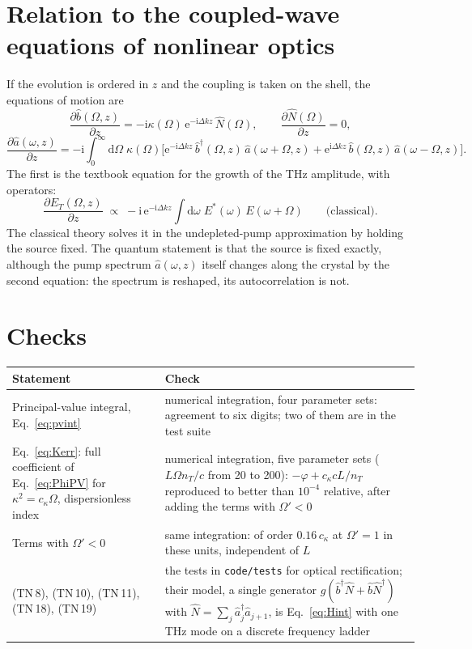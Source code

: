 \documentclass[aps,pra,onecolumn,notitlepage,11pt,amsmath,amssymb,nofootinbib]{revtex4-2}
\newcommand{\Nop}{\hat N}
\newcommand{\dd}{\mathrm{d}}
\newcommand{\ee}{\mathrm{e}}
\newcommand{\ii}{\mathrm{i}}
\begin{document}
\section{Relation to the coupled-wave equations of nonlinear optics}

If the evolution is ordered in $z$ and the coupling is taken on the shell,
the equations of motion are
\begin{equation}
\frac{\partial\hat b(\Omega,z)}{\partial z}=-\ii\kappa(\Omega)\,\ee^{-\ii\Delta kz}\,\Nop(\Omega),\qquad
\frac{\partial\Nop(\Omega)}{\partial z}=0,
\end{equation}
\begin{equation}
\frac{\partial\hat a(\omega,z)}{\partial z}=-\ii\int_0^\infty\!\!\dd\Omega\;\kappa(\Omega)
\Big[\ee^{-\ii\Delta kz}\,\hat b^\dagger(\Omega,z)\,\hat a(\omega+\Omega,z)
+\ee^{\ii\Delta kz}\,\hat b(\Omega,z)\,\hat a(\omega-\Omega,z)\Big].
\end{equation}
The first is the textbook equation for the growth of the THz amplitude, with
operators:
\begin{equation}
\frac{\partial E_T(\Omega,z)}{\partial z}\;\propto\;-\ii\,\ee^{-\ii\Delta kz}
\int\!\dd\omega\;E^*(\omega)\,E(\omega+\Omega)\qquad\text{(classical)}.
\end{equation} The classical theory solves it in the undepleted-pump
approximation by holding the source fixed. The quantum statement is that the
source is fixed exactly, although the pump spectrum $\hat a(\omega,z)$ itself
changes along the crystal by the second equation: the spectrum is reshaped,
its autocorrelation is not.

\section{Checks}

\begin{center}
\begin{tabular}{R{0.38\textwidth}R{0.55\textwidth}}
\hline\hline
Statement & Check\\
\hline
Principal-value integral, Eq.~\eqref{eq:pvint} & numerical integration, four parameter sets: agreement to six digits; two of them are in the test suite\\[4pt]
Eq.~\eqref{eq:Kerr}: full coefficient of Eq.~\eqref{eq:PhiPV} for $\kappa^2=c_\kappa\Omega$, dispersionless index & numerical integration, five parameter sets ($L\Omega n_T/c$ from 20 to 200): $-\varphi+c_\kappa cL/n_T$ reproduced to better than $10^{-4}$ relative, after adding the terms with $\Omega'<0$\\[4pt]
Terms with $\Omega'<0$ & same integration: of order $0.16\,c_\kappa$ at $\Omega'=1$ in these units, independent of $L$\\[4pt]
(TN\,8), (TN\,10), (TN\,11), (TN\,18), (TN\,19) & the tests in \texttt{code/tests} for optical rectification; their model, a single generator $g(\hat b^\dagger\Nop+\hat b\Nop^\dagger)$ with $\Nop=\sum_j\hat a_j^\dagger\hat a_{j+1}$, is Eq.~\eqref{eq:Hint} with one THz mode on a discrete frequency ladder\\
\hline\hline
\end{tabular}
\end{center}
\end{document}
